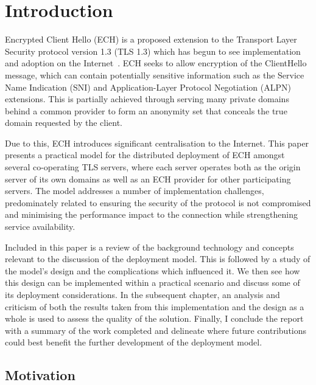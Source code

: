 \chapter{Introduction}\label{Introduction}

Encrypted Client Hello (ECH) is a proposed extension to the Transport Layer Security protocol version 1.3 (TLS 1.3) which has begun to see implementation and adoption on the Internet~\cite{tsiatsikas2022measuring, CF-ECH}. ECH seeks to allow encryption of the ClientHello message, which can contain potentially sensitive information such as the Service Name Indication (SNI) and Application-Layer Protocol Negotiation (ALPN) extensions. This is partially achieved through serving many private domains behind a common provider to form an anonymity set that conceals the true domain requested by the client.

Due to this, ECH introduces significant centralisation to the Internet. This paper presents a practical model for the distributed deployment of ECH amongst several co-operating TLS servers, where each server operates both as the origin server of its own domains as well as an ECH provider for other participating servers. The model addresses a number of implementation challenges, predominately related to ensuring the security of the protocol is not compromised and minimising the performance impact to the connection while strengthening service availability.

Included in this paper is a review of the background technology and concepts relevant to the discussion of the deployment model. This is followed by a study of the model's design and the complications which influenced it. We then see how this design can be implemented within a practical scenario and discuss some of its deployment considerations. In the subsequent chapter, an analysis and criticism of both the results taken from this implementation and the design as a whole is used to assess the quality of the solution. Finally, I conclude the report with a summary of the work completed and delineate where future contributions could best benefit the further development of the deployment model.









\section{Motivation}

